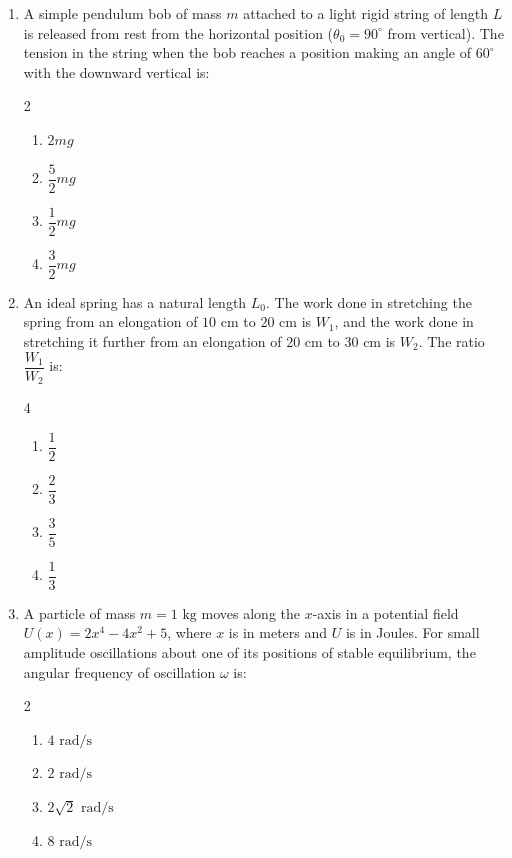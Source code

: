 \documentclass[11pt,a4paper]{article}
\begin{document}
\begin{enumerate}[label=\textbf{\arabic*.},leftmargin=18pt,itemsep=12pt]
  \item A simple pendulum bob of mass $m$ attached to a light rigid string of length $L$ is released from rest from the horizontal position ($\theta_0 = 90^\circ$ from vertical). The tension in the string when the bob reaches a position making an angle of $60^\circ$ with the downward vertical is:
  \begin{multicols}{2}
    \begin{enumerate}[label=(\Alph*)]
      \item $2mg$
      \item $\dfrac{5}{2}mg$
      \item $\dfrac{1}{2}mg$
      \item $\dfrac{3}{2}mg$
    \end{enumerate}
  \end{multicols}

  \item An ideal spring has a natural length $L_0$. The work done in stretching the spring from an elongation of $10\text{ cm}$ to $20\text{ cm}$ is $W_1$, and the work done in stretching it further from an elongation of $20\text{ cm}$ to $30\text{ cm}$ is $W_2$. The ratio $\dfrac{W_1}{W_2}$ is:
  \begin{multicols}{4}
    \begin{enumerate}[label=(\Alph*)]
      \item $\dfrac{1}{2}$
      \item $\dfrac{2}{3}$
      \item $\dfrac{3}{5}$
      \item $\dfrac{1}{3}$
    \end{enumerate}
  \end{multicols}

  \item A particle of mass $m = 1\text{ kg}$ moves along the $x$-axis in a potential field $U(x) = 2x^4 - 4x^2 + 5$, where $x$ is in meters and $U$ is in Joules. For small amplitude oscillations about one of its positions of stable equilibrium, the angular frequency of oscillation $\omega$ is:
  \begin{multicols}{2}
    \begin{enumerate}[label=(\Alph*)]
      \item $4\text{ rad/s}$
      \item $2\text{ rad/s}$
      \item $2\sqrt{2}\text{ rad/s}$
      \item $8\text{ rad/s}$
    \end{enumerate}
  \end{multicols}


\end{enumerate}
\end{document}
